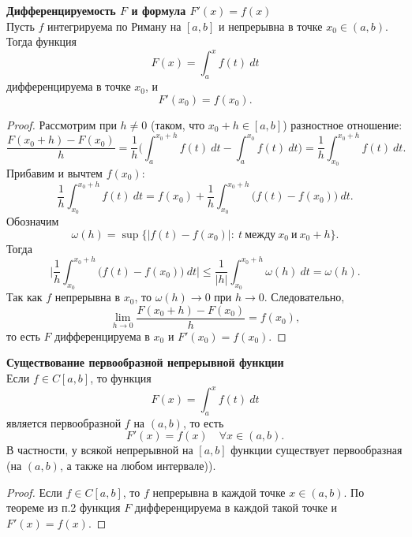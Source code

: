 \documentclass[14pt]{extreport}
\begin{document}
    \begin{theorem}
        \textbf{Дифференцируемость $F$ и формула $F'(x) = f(x)$}\\
        Пусть $f$ интегрируема по Риману на $[a,b]$ и непрерывна в точке $x_0 \in (a,b)$. Тогда функция
        \[
        F(x) = \int_a^x f(t)\ dt
        \]
        дифференцируема в точке $x_0$, и
        \[
        F'(x_0) = f(x_0).
        \]
    \end{theorem}

    \begin{proof}
        Рассмотрим при $h \neq 0$ (таком, что $x_0+h \in [a,b]$) разностное отношение:
        \[
        \frac{F(x_0+h) - F(x_0)}{h} = \frac{1}{h} \Bigg( \int_a^{x_0+h} f(t)\ dt - \int_a^{x_0} f(t)\ dt \Bigg) = \frac{1}{h} \int_{x_0}^{x_0+h} f(t)\ dt.
        \]
        Прибавим и вычтем $f(x_0)$:
        \[
        \frac{1}{h} \int_{x_0}^{x_0+h} f(t)\ dt = f(x_0) + \frac{1}{h} \int_{x_0}^{x_0+h} \bigl( f(t) - f(x_0) \bigr)\ dt.
        \]
        Обозначим
        \[
        \omega(h) = \sup \{ |f(t)-f(x_0)|:\ t\ \text{между}\ x_0\ \text{и}\ x_0+h \}.
        \]
        Тогда
        \[
        \Bigg| \frac{1}{h} \int_{x_0}^{x_0+h} \bigl( f(t) - f(x_0) \bigr)\ dt \Bigg| \leq \frac{1}{|h|} \int_{x_0}^{x_0+h} \omega(h)\ dt = \omega(h).
        \]
        Так как $f$ непрерывна в $x_0$, то $\omega(h) \rightarrow 0$ при $h \rightarrow 0$. Следовательно,
        \[
        \lim_{h \rightarrow 0} \frac{F(x_0+h) - F(x_0)}{h} = f(x_0),
        \]
        то есть $F$ дифференцируема в $x_0$ и $F'(x_0) = f(x_0)$.
    \end{proof}

    \begin{theorem}
        \textbf{Существование первообразной непрерывной функции}\\
        Если $f \in C[a,b]$, то функция
        \[
        F(x) = \int_a^x f(t)\ dt
        \]
        является первообразной $f$ на $(a,b)$, то есть
        \[
        F'(x) = f(x) \quad \forall x \in (a,b).
        \]
        В частности, у всякой непрерывной на $[a,b]$ функции существует первообразная (на $(a,b)$, а также на любом интервале)).
    \end{theorem}

    \begin{proof}
        Если $f \in C[a,b]$, то $f$ непрерывна в каждой точке $x \in (a,b)$. По теореме из п.2 функция $F$ дифференцируема в каждой такой точке и $F'(x) = f(x)$.
    \end{proof}
\end{document}
